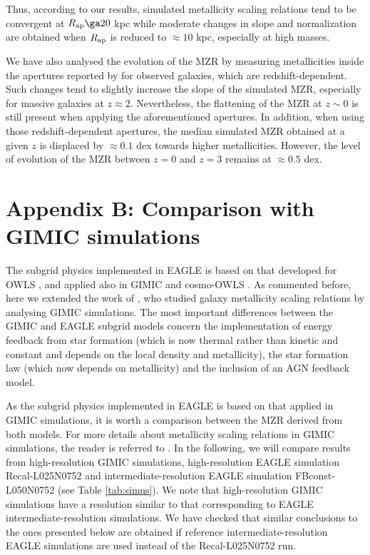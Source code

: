 \documentclass[useAMS,usenatbib]{mn2e}
\begin{document}
Thus, according to our results, simulated metallicity scaling relations 
tend to be convergent at $R_{\rm ap} \ga 20$ kpc while moderate changes in slope
and normalization are obtained when $R_{\rm ap}$ is reduced to $\approx 10$ kpc,
especially at high masses.

We have also analysed the evolution of the MZR 
by measuring metallicities inside the apertures reported by \citet{maiolino2008} for observed galaxies, 
which are redshift-dependent.
Such changes tend to slightly increase the slope of the simulated MZR, especially for massive galaxies
at $z\approx 2$.  Nevertheless, the flattening of the MZR at $z\sim 0$ is still present when applying 
the aforementioned apertures.
In addition, when using those redshift-dependent apertures,
the median simulated MZR obtained at a given $z$ is displaced by $\approx 0.1$ dex towards higher metallicities.  
However, the level of evolution of the MZR between $z=0$ and $z=3$ remains at $\approx 0.5$ dex.

\section*{Appendix B: Comparison with {\sc GIMIC} simulations}
\label{sec:gimic}

The subgrid physics implemented in {\sc EAGLE} is based on that developed for OWLS
\citep{schaye2010}, and applied also in {\sc GIMIC} \citep{crain2009} and 
cosmo-OWLS \citep{lebrun2014}. 
As commented before,
here we extended the work of \citet{derossi2015}, who studied galaxy metallicity scaling relations
by analysing {\sc GIMIC} simulations.
The most important differences between the {\sc GIMIC} and {\sc EAGLE} subgrid models concern the 
implementation of energy feedback from star formation (which is now thermal rather than kinetic and constant
and depends on the local density and metallicity), 
the star formation law (which now depends on metallicity) and the inclusion of an AGN feedback model.

As the subgrid physics implemented in {\sc EAGLE} is based on that applied
in {\sc GIMIC} simulations, it is worth a comparison between the MZR derived from both models.
For more details about metallicity scaling relations in {\sc GIMIC} simulations,
the reader is referred to \citet{derossi2015, derossi2015b, derossi2016}.
In the following, we will compare results from high-resolution {\sc GIMIC} simulations, 
high-resolution {\sc EAGLE} simulation Recal-L025N0752 and intermediate-resolution {\sc EAGLE} simulation
FBconst-L050N0752 (see Table \ref{tab:simus}).
We note that high-resolution {\sc GIMIC} simulations have a resolution similar to that corresponding
to {\sc EAGLE} intermediate-resolution simulations.
We have checked that similar conclusions to the ones presented below are obtained if 
reference intermediate-resolution {\sc EAGLE} simulations are used instead of the Recal-L025N0752 run.
\end{document}
